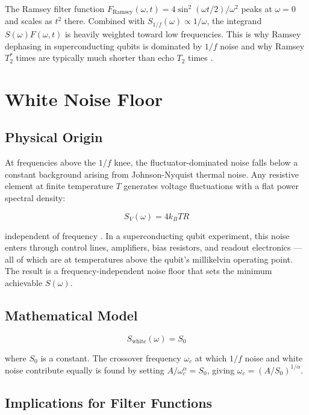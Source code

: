 \documentclass[10pt]{article}
\begin{document}
The Ramsey filter function $F_\text{Ramsey}(\omega, t) = 4\sin^2(\omega t/2)/\omega^2$ peaks at $\omega = 0$ and scales as $t^2$ there. Combined with $S_{1/f}(\omega) \propto 1/\omega$, the integrand $S(\omega)F(\omega,t)$ is heavily weighted toward low frequencies. This is why Ramsey dephasing in superconducting qubits is dominated by $1/f$ noise and why Ramsey $T_2^*$ times are typically much shorter than echo $T_2$ times \cite{Bylander2011}.

\section{White Noise Floor}

\subsection{Physical Origin}

At frequencies above the $1/f$ knee, the fluctuator-dominated noise falls below a constant background arising from Johnson-Nyquist thermal noise. Any resistive element at finite temperature $T$ generates voltage fluctuations with a flat power spectral density:

\begin{equation}
    S_V(\omega) = 4k_B T R
\end{equation}

independent of frequency \cite{Clerk2010}. In a superconducting qubit experiment, this noise enters through control lines, amplifiers, bias resistors, and readout electronics — all of which are at temperatures above the qubit's millikelvin operating point. The result is a frequency-independent noise floor that sets the minimum achievable $S(\omega)$.

\subsection{Mathematical Model}

\begin{equation}
    \boxed{S_\text{white}(\omega) = S_0}
\end{equation}

where $S_0$ is a constant. The crossover frequency $\omega_c$ at which $1/f$ noise and white noise contribute equally is found by setting $A/\omega_c^\alpha = S_0$, giving $\omega_c = (A/S_0)^{1/\alpha}$.

\subsection{Implications for Filter Functions}
\end{document}
